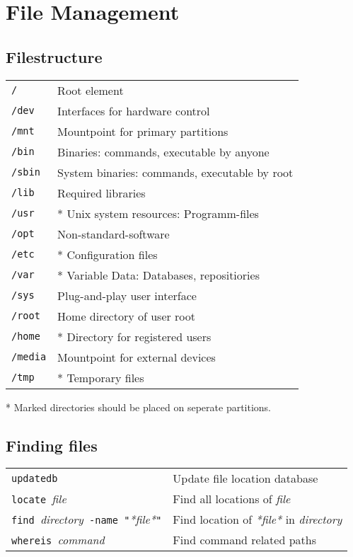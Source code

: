 \section{File Management}
\subsection{Filestructure}
\begin{tabular}{@{}p{\the\MyLen}%
				@{}p{\linewidth-\the\MyLen}}
	\verb!/!		& Root element\\
	\verb!/dev!		& Interfaces for hardware control\\
	\verb!/mnt!		& Mountpoint for primary partitions\\
	\verb!/bin!		& Binaries: commands, executable by anyone\\
	\verb!/sbin!	& System binaries: commands, executable by root\\
	\verb!/lib!		& Required libraries\\
	\verb!/usr!		& * Unix system resources: Programm-files\\
	\verb!/opt!		& Non-standard-software\\
	\verb!/etc!		& * Configuration files\\
	\verb!/var!		& * Variable Data: Databases, repositiories\\
	\verb!/sys!		& Plug-and-play user interface\\
	\verb!/root!	& Home directory of user root\\
	\verb!/home!	& * Directory for registered users\\
	\verb!/media!	& Mountpoint for external devices\\
	\verb!/tmp!		& * Temporary files\\
\end{tabular}
* Marked directories should be placed on seperate partitions.

\subsection{Finding files}
\begin{tabular}{@{}p{\the\MyLen}%
				@{}p{\linewidth-\the\MyLen}}
	\verb!updatedb!															& Update file location database\\
	\verb!locate !\textit{file}												& Find all locations of \textit{file}\\
	\verb!find !\textit{directory}\verb! -name "!\textit{*file*}\verb!"!	& Find location of \textit{*file*} in \textit{directory}\\
	\verb!whereis !\textit{command}											& Find command related paths \\
\end{tabular}

